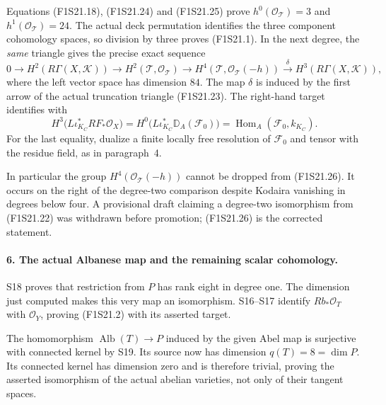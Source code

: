 Equations (F1S21.18), (F1S21.24) and (F1S21.25) prove
$h^0(\mathcal O_{\mathcal T})=3$ and
$h^1(\mathcal O_{\mathcal T})=24$. The actual deck
permutation identifies the three component cohomology
spaces, so division by three proves (F1S21.1).
In the next degree, the \emph{same} triangle gives the
precise exact sequence
\[
 0\longrightarrow H^2(R\Gamma(X,\mathcal K))
 \longrightarrow H^2(\mathcal T,\mathcal O_{\mathcal T})
 \longrightarrow H^4(\mathcal T,\mathcal O_{\mathcal T}(-h))
 \xrightarrow{\delta}
 H^3(R\Gamma(X,\mathcal K)),
 \tag{F1S21.26}
\]
where the left vector space has dimension $84$. The map
$\delta$ is induced by the first arrow of the actual
truncation triangle (F1S21.23). The right-hand target
identifies with
\[
 H^3\bigl(L\iota_{K_C}^*RF_*\mathcal O_X\bigr)
   =H^0\bigl(L\iota_{K_C}^*\mathbb D_A(\mathcal F_0)\bigr)
   =\operatorname{Hom}_A(\mathcal F_0,k_{K_C}).
 \tag{F1S21.26a}
\]
For the last equality, dualize a finite locally free
resolution of $\mathcal F_0$ and tensor with the residue
field, as in paragraph~4.

In particular the group $H^4(\mathcal O_{\mathcal T}(-h))$
cannot be dropped from (F1S21.26). It occurs on the right
of the degree-two comparison despite Kodaira vanishing
in degrees below four. A provisional draft claiming a
degree-two isomorphism from (F1S21.22) was withdrawn
before promotion; (F1S21.26) is the corrected statement.

\paragraph{6. The actual Albanese map and the remaining scalar cohomology.}
S18 proves that restriction from $P$ has rank eight in
degree one. The dimension just computed makes this very
map an isomorphism. S16--S17 identify $Rb_*\mathcal O_T$
with $\mathcal O_Y$, proving (F1S21.2) with its asserted
target.

The homomorphism $\operatorname{Alb}(T)\to P$ induced by
the given Abel map is surjective with connected kernel
by S19. Its source now has dimension $q(T)=8=\dim P$.
Its connected kernel has dimension zero and is therefore
trivial, proving the asserted isomorphism of the actual
abelian varieties, not only of their tangent spaces.

